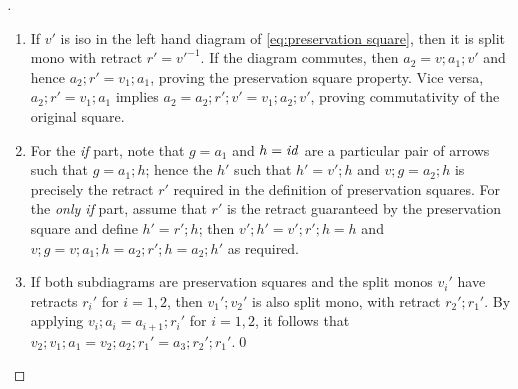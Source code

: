 \begin{proof}[]
\begin{enumerate}[defsep]
\item If $v'$ is iso in the left hand diagram of \eqref{eq:preservation square}, then it is split mono with retract $r'=v'^{-1}$. If the diagram commutes, then $a_2=v;a_1;v'$ and hence $a_2;r'=v_1;a_1$, proving the preservation square property. Vice versa, $a_2;r'=v_1;a_1$ implies $a_2=a_2;r';v'=v_1;a_2;v'$, proving commutativity of the original square.

\item For the \emph{if} part, note that $g=a_1$ and $h=\mathit{id}$ are a particular pair of arrows such that $g=a_1;h$; hence the $h'$ such that $h'=v';h$ and $v;g=a_2;h$ is precisely the retract $r'$ required in the definition of preservation squares. For the \emph{only if} part, assume that $r'$ is the retract guaranteed by the preservation square and define $h'=r';h$; then $v';h'=v';r';h=h$ and $v;g=v;a_1;h=a_2;r';h=a_2;h'$ as required.

\item If both subdiagrams are preservation squares and the split monos $v_i'$ have retracts $r_i'$ for $i=1,2$, then $v_1';v_2'$ is also split mono, with retract $r_2';r_1'$. By applying $v_i;a_i=a_{i+1};r_i'$ for $i=1,2$, it follows that $v_2;v_1;a_1=v_2;a_2;r_1'=a_3;r_2';r_1'$.\qed
\end{enumerate}
\end{proof}

